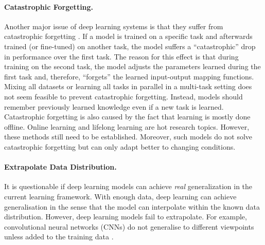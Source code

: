 \paragraph{Catastrophic Forgetting.} Another major issue of deep learning systems is that they suffer from catastrophic forgetting \cite{kirkpatrick_overcoming_2017, liu_overcoming_2021}.
If a model is trained on a specific task and afterwards trained (or fine-tuned) on another task, the model suffers a ``catastrophic'' drop in performance over the first task.
The reason for this effect is that during training on the second task, the model adjusts the parameters learned during the first task and, therefore, ``forgets'' the learned input-output mapping functions.
Mixing all datasets or learning all tasks in parallel in a multi-task setting \cite{zhang_survey_2022} does not seem feasible to prevent catastrophic forgetting. Instead, models should remember previously learned knowledge even if a new task is learned.
Catastrophic forgetting is also caused by the fact that learning is mostly done offline.
Online learning \cite{sahoo_online_2018} and lifelong learning \cite{parisi_continual_2019} are hot research topics.
However, these methods still need to be established. Moreover, such models do not solve catastrophic forgetting but can only adapt better to changing conditions.

\paragraph{Extrapolate Data Distribution.} It is questionable if deep learning models can achieve \emph{real} generalization in the current learning framework.
With enough data, deep learning can achieve generalisation in the sense that the model can interpolate within the known data distribution.
However, deep learning models fail to extrapolate.
For example, convolutional neural networks (CNNs) do not generalise to different viewpoints unless added to the training data .

